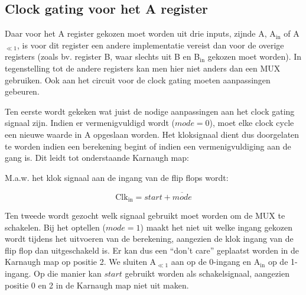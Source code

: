 \subsection{Clock gating voor het A register}

Daar voor het A register gekozen moet worden uit drie  inputs, zijnde A, A$_{\text{in}}$ of A$_{\ll 1}$, is voor dit register een andere implementatie vereist dan voor de overige registers (zoals bv. register B, waar slechts uit B en B$_{\text{in}}$ gekozen moet worden). In tegenstelling tot de andere registers kan men hier niet anders dan een MUX gebruiken. Ook aan het circuit voor de clock gating moeten aanpassingen gebeuren.

Ten eerste wordt gekeken wat juist de nodige aanpassingen aan het clock gating signaal zijn. Indien er vermenigvuldigd wordt ($mode = 0$), moet elke clock cycle een nieuwe waarde in A opgeslaan worden. Het kloksignaal dient dus doorgelaten te worden indien een berekening begint of indien een vermenigvuldiging aan de gang is. Dit leidt tot onderstaande Karnaugh map:


\vspace{\textfloatsep}
\begin{minipage}{\linewidth}
	\begin{center}
	\end{center}
\end{minipage}
\vspace{\textfloatsep}

M.a.w. het klok signaal aan de ingang van de flip flops wordt:

\[ \text{Clk}_{\text{in}} = start + \overline{mode} \]

Ten tweede wordt gezocht welk signaal gebruikt moet worden om de MUX te schakelen. Bij het optellen ($mode = 1$) maakt het niet uit welke ingang gekozen wordt tijdens het uitvoeren van de berekening, aangezien de klok ingang van de flip flop dan uitgeschakeld is. Er kan dus een ``don't care'' geplaatst worden in de Karnaugh map op positie 2. We sluiten A$_{\ll 1}$ aan op de 0-ingang en A$_{\text{in}}$ op de 1-ingang. Op die manier kan $start$ gebruikt worden als schakelsignaal, aangezien positie 0 en 2 in de Karnaugh map niet uit maken.

\vspace{\textfloatsep}
\begin{minipage}{\linewidth}
	\begin{center}
	\end{center}
	\end{minipage}
\vspace{\textfloatsep}

